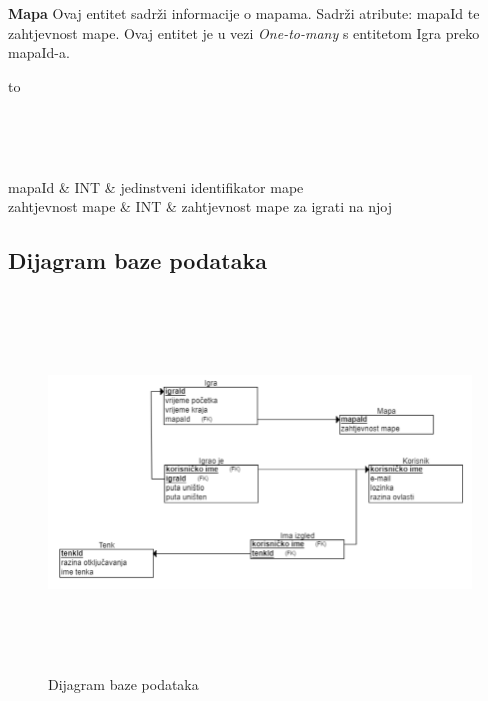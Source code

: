 			\textbf{Mapa} Ovaj entitet sadrži informacije o mapama. Sadrži atribute: mapaId te zahtjevnost mape. Ovaj entitet je u vezi \textit{One-to-many} s entitetom Igra preko mapaId-a.
			
				\begin{longtabu} to \textwidth {|X[6, l]|X[6, l]|X[20, l]|}
					
					\hline {}	 \\[3pt] \hline
					\endfirsthead
					
					\hline {}	 \\[3pt] \hline
					\endhead
					
					\hline 
					\endlastfoot
					
					mapaId	& INT & jedinstveni identifikator mape  	\\ \hline 
					zahtjevnost mape & INT & zahtjevnost mape za igrati na njoj  \\ \hline
					
					
				\end{longtabu}
				
			
			\subsection{Dijagram baze podataka}
				
				\begin{figure}[h]
					\centering
					\includegraphics[width=18.5cm,height=10cm]{./databaseDiagram}
					\caption{Dijagram baze podataka}
					\label{fig:uc}
				\end{figure}
			
